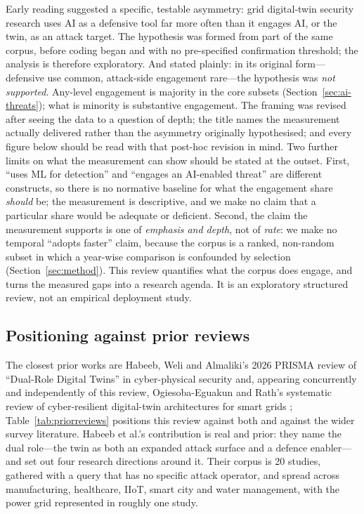 \documentclass[preprint,12pt]{elsarticle}
\renewcommand{\_}{\plainunderscore\allowbreak}
\begin{document}
Early reading suggested a specific, testable asymmetry: grid digital-twin security research
uses AI as a defensive tool far more often than it engages AI, or the twin, as an attack
target. The hypothesis was formed from part of the same corpus, before coding began and
with no pre-specified confirmation threshold; the analysis is therefore exploratory. And
stated plainly: in its original form---defensive use common, attack-side engagement
rare---the hypothesis was \emph{not supported}. Any-level engagement is majority in the
core subsets (Section~\ref{sec:ai-threats}); what is minority is substantive engagement.
The framing was revised after seeing the data to a question of depth; the title names the
measurement actually delivered rather than the asymmetry originally hypothesised; and
every figure below should be read with that post-hoc revision in mind. Two further
limits on what the measurement can show should be stated at the outset. First, ``uses
ML for detection'' and ``engages an AI-enabled threat'' are different constructs, so
there is no normative baseline for what the engagement share \emph{should} be; the
measurement is descriptive, and we make no claim that a particular share would be
adequate or deficient. Second, the claim the measurement supports is one of
\emph{emphasis and depth}, not of \emph{rate}: we make no temporal ``adopts faster''
claim, because the corpus is a ranked, non-random subset in which a year-wise
comparison is confounded by selection (Section~\ref{sec:method}).
This review quantifies what the corpus does engage, and turns the measured gaps into a
research agenda. It is an exploratory structured review, not an empirical deployment
study.

\subsection{Positioning against prior reviews}\label{sec:positioning}

The closest prior works are Habeeb, Weli and Almaliki's 2026 PRISMA review of ``Dual-Role
Digital Twins'' in cyber-physical security \cite{habeeb2026} and, appearing concurrently
and independently of this review, Ogiesoba-Eguakun and Rath's systematic review of
cyber-resilient digital-twin architectures for smart grids \cite{ogiesoba2026};
Table~\ref{tab:priorreviews} positions this review against both and against the wider
survey literature. Habeeb et al.'s contribution is real and prior: they name the dual role---the twin as
both an expanded attack surface and a defence enabler---and set out four research directions
around it. Their corpus is 20 studies, gathered with a query that has no specific attack operator,
and spread across manufacturing, healthcare, IIoT, smart city and water management, with the
power grid represented in roughly one study.
\end{document}
